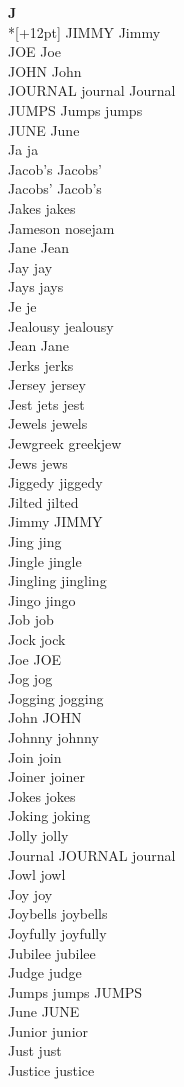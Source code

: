\vspace{14pt}
\noindent\textbf{\Large J}\\*[+12pt]
JIMMY Jimmy\\
JOE Joe\\
JOHN John\\
JOURNAL journal Journal\\
JUMPS Jumps jumps\\
JUNE June\\
Ja ja\\
Jacob's Jacobs'\\
Jacobs' Jacob's\\
Jakes jakes\\
Jameson nosejam\\
Jane Jean\\
Jay jay\\
Jays jays\\
Je je\\
Jealousy jealousy\\
Jean Jane\\
Jerks jerks\\
Jersey jersey\\
Jest jets jest\\
Jewels jewels\\
Jewgreek greekjew\\
Jews jews\\
Jiggedy jiggedy\\
Jilted jilted\\
Jimmy JIMMY\\
Jing jing\\
Jingle jingle\\
Jingling jingling\\
Jingo jingo\\
Job job\\
Jock jock\\
Joe JOE\\
Jog jog\\
Jogging jogging\\
John JOHN\\
Johnny johnny\\
Join join\\
Joiner joiner\\
Jokes jokes\\
Joking joking\\
Jolly jolly\\
Journal JOURNAL journal\\
Jowl jowl\\
Joy joy\\
Joybells joybells\\
Joyfully joyfully\\
Jubilee jubilee\\
Judge judge\\
Jumps jumps JUMPS\\
June JUNE\\
Junior junior\\
Just just\\
Justice justice\\

